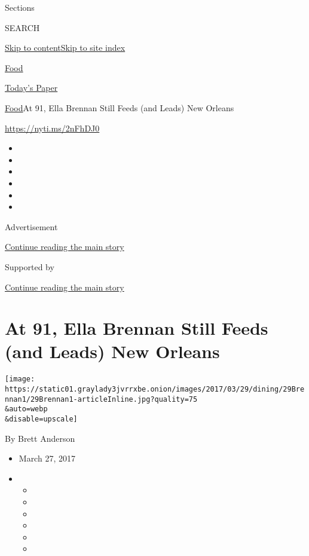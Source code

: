 Sections

SEARCH

\protect\hyperlink{site-content}{Skip to
content}\protect\hyperlink{site-index}{Skip to site index}

\href{https://www.nytimes3xbfgragh.onion/section/food}{Food}

\href{https://myaccount.nytimes3xbfgragh.onion/auth/login?response_type=cookie\&client_id=vi}{}

\href{https://www.nytimes3xbfgragh.onion/section/todayspaper}{Today's
Paper}

\href{/section/food}{Food}\textbar{}At 91, Ella Brennan Still Feeds (and
Leads) New Orleans

\url{https://nyti.ms/2nFhDJ0}

\begin{itemize}
\item
\item
\item
\item
\item
\item
\end{itemize}

Advertisement

\protect\hyperlink{after-top}{Continue reading the main story}

Supported by

\protect\hyperlink{after-sponsor}{Continue reading the main story}

\hypertarget{at-91-ella-brennan-still-feeds-and-leads-new-orleans}{%
\section{At 91, Ella Brennan Still Feeds (and Leads) New
Orleans}\label{at-91-ella-brennan-still-feeds-and-leads-new-orleans}}

\texttt{[image: https://static01.graylady3jvrrxbe.onion/images/2017/03/29/dining/29Brennan1/29Brennan1-articleInline.jpg?quality=75\\\&auto=webp\\\&disable=upscale]}

By Brett Anderson

\begin{itemize}
\item
  March 27, 2017
\item
  \begin{itemize}
  \item
  \item
  \item
  \item
  \item
  \item
  \end{itemize}
\end{itemize}

